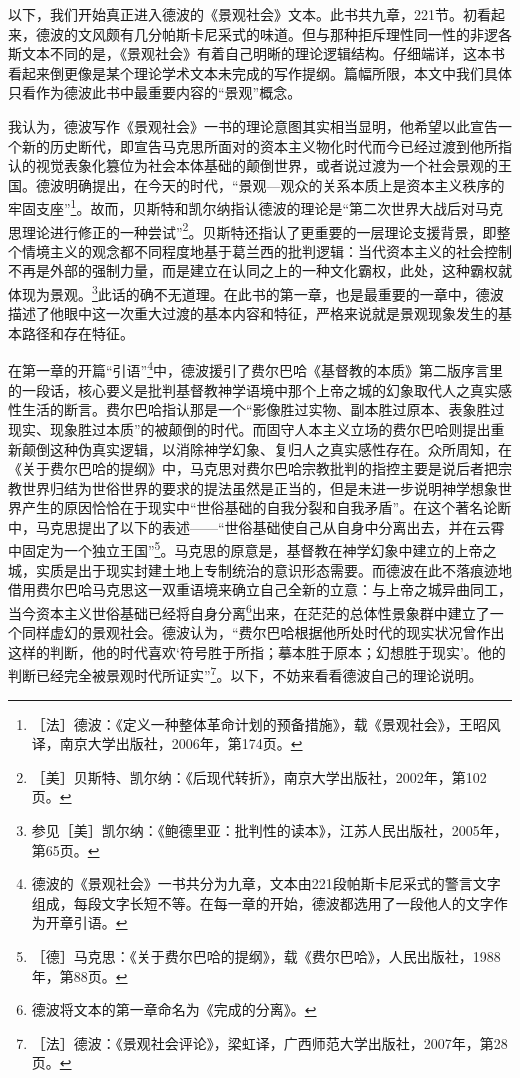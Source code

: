 \documentclass[fontset=fandol, a4paper, 12pt, openright]{ctexbook}
\begin{document}
以下，我们开始真正进入德波的《景观社会》文本。此书共九章，221节。初看起来，德波的文风颇有几分帕斯卡尼采式的味道。但与那种拒斥理性同一性的非逻各斯文本不同的是，《景观社会》有着自己明晰的理论逻辑结构。仔细端详，这本书看起来倒更像是某个理论学术文本未完成的写作提纲。篇幅所限，本文中我们具体只看作为德波此书中最重要内容的“景观”概念。

我认为，德波写作《景观社会》一书的理论意图其实相当显明，他希望以此宣告一个新的历史断代，即宣告马克思所面对的资本主义物化时代而今已经过渡到他所指认的视觉表象化篡位为社会本体基础的颠倒世界，或者说过渡为一个社会景观的王国。德波明确提出，在今天的时代，“景观—观众的关系本质上是资本主义秩序的牢固支座”\footnote{［法］德波：《定义一种整体革命计划的预备措施》，载《景观社会》，王昭风译，南京大学出版社，2006年，第174页。}。{\kaishu 故而，贝斯特和凯尔纳指认德波的理论是“第二次世界大战后对马克思理论进行修正的一种尝试”\footnote{［美］贝斯特、凯尔纳：《后现代转折》，南京大学出版社，2002年，第102页。}。贝斯特还指认了更重要的一层理论支援背景，即整个情境主义的观念都不同程度地基于葛兰西的批判逻辑：当代资本主义的社会控制不再是外部的强制力量，而是建立在认同之上的一种文化霸权，此处，这种霸权就体现为景观。\footnote{参见［美］凯尔纳：《鲍德里亚：批判性的读本》，江苏人民出版社，2005年，第65页。}}此话的确不无道理。在此书的第一章，也是最重要的一章中，德波描述了他眼中这一次重大过渡的基本内容和特征，严格来说就是景观现象发生的基本路径和存在特征。

在第一章的开篇“引语”\footnote{德波的《景观社会》一书共分为九章，文本由221段帕斯卡尼采式的警言文字组成，每段文字长短不等。在每一章的开始，德波都选用了一段他人的文字作为开章引语。}中，德波援引了费尔巴哈《基督教的本质》第二版序言里的一段话，核心要义是批判基督教神学语境中那个上帝之城的幻象取代人之真实感性生活的断言。费尔巴哈指认那是一个“影像胜过实物、副本胜过原本、表象胜过现实、现象胜过本质”的被颠倒的时代。而固守人本主义立场的费尔巴哈则提出重新颠倒这种伪真实逻辑，以消除神学幻象、复归人之真实感性存在。众所周知，在《关于费尔巴哈的提纲》中，马克思对费尔巴哈宗教批判的指控主要是说后者把宗教世界归结为世俗世界的要求的提法虽然是正当的，但是未进一步说明神学想象世界产生的原因恰恰在于现实中“世俗基础的自我分裂和自我矛盾”。在这个著名论断中，马克思提出了以下的表述——“世俗基础使自己从自身中分离出去，并在云霄中固定为一个独立王国”\footnote{［德］马克思：《关于费尔巴哈的提纲》，载《费尔巴哈》，人民出版社，1988年，第88页。}。马克思的原意是，基督教在神学幻象中建立的上帝之城，实质是出于现实封建土地上专制统治的意识形态需要。而德波在此不落痕迹地借用费尔巴哈马克思这一双重语境来确立自己全新的立意：与上帝之城异曲同工，当今资本主义世俗基础已经将自身分离\footnote{德波将文本的第一章命名为《完成的分离》。}出来，在茫茫的总体性景象群中建立了一个同样虚幻的景观社会。德波认为，“费尔巴哈根据他所处时代的现实状况曾作出这样的判断，他的时代喜欢‘符号胜于所指；摹本胜于原本；幻想胜于现实’。他的判断已经完全被景观时代所证实”\footnote{［法］德波：《景观社会评论》，梁虹译，广西师范大学出版社，2007年，第28页。}。以下，不妨来看看德波自己的理论说明。
\end{document}
